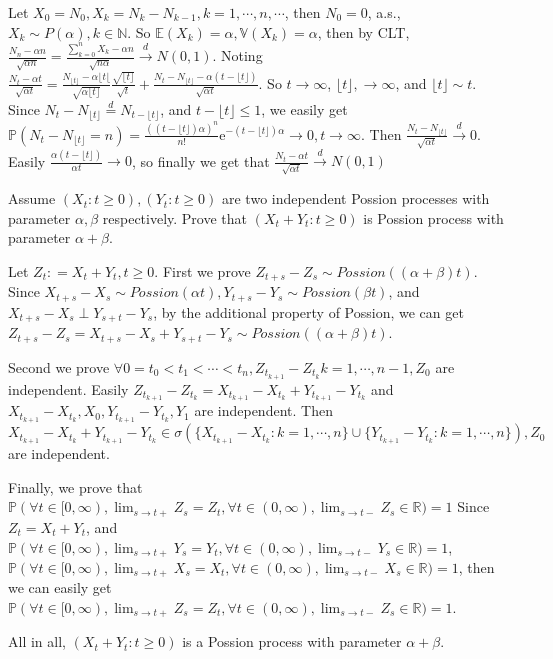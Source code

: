 \documentclass{ctexart}
\newcommand{\floor}[1]{\lfloor #1 \rfloor}
\begin{document}
\begin{solution}
  Let \(X_0=N_0,X_k=N_k-N_{k-1}, k= 1,\cdots,n,\cdots\), then \(N_0=0\), a.s., \(X_k \sim P(\alpha), k \in \mathbb{N}\).
  So \(\mathbb{E}(X_k)=\alpha, \mathbb{V}(X_k)= \alpha\), then by CLT, \(\frac{N_n-\alpha n}{\sqrt{\alpha n}}=\frac{\sum_{k=0}^{n}X_k-\alpha n}{\sqrt{n \alpha}} \overset{d}{\to} N(0,1)\).
  Noting \(\frac{N_t - \alpha t}{\sqrt{ \alpha t}}=\frac{N_{\floor{t}}-\alpha \lfloor t\lfloor}{\sqrt{ \alpha \floor{t}}} \frac{\sqrt{\floor{t}}}{\sqrt{t}} + \frac{N_t-N_{\floor{t}}-\alpha(t-\floor{t})}{\sqrt{\alpha t}}\).
  So \(t \to \infty\), \(\floor{t}, \to \infty\), and \(\floor{t} \sim t\).
  Since \(N_t-N_{\floor{t}}\overset{d}{=}N_{t-\floor{t}}\), and \(t - \floor{t} \leq 1\), we easily get \(\mathbb{P}(N_t-N_{\lfloor t\rfloor}=n)=\frac{((t-\lfloor t\rfloor)\alpha)^n}{n !} \mathrm{e}^{-(t-\lfloor t\rfloor)\alpha} \to 0, t \to \infty\).
  Then \(\frac{N_t-N_{\floor{t}}}{\sqrt{ \alpha t}} \overset{d}{\to} 0\).
  Easily \(\frac{\alpha(t-\floor{t})}{\alpha t} \to 0\), so finally we get that
  \(\frac{N_t-\alpha t}{\sqrt{ \alpha t}} \overset{d}{\to} N(0,1)\)
\end{solution}

\begin{problem}\label{pro:4}
  Assume \((X_t:t \geq 0),(Y_t:t \geq 0)\) are two independent Possion processes with parameter \(\alpha,\beta\) respectively.
  Prove that \((X_t + Y_t:t \geq 0)\) is Possion process with parameter \(\alpha + \beta\).
\end{problem}
\begin{solution}
  Let \(Z_t: =X_t + Y_t, t \geq 0\).
  First we prove \(Z_{t+s}-Z_s \sim Possion((\alpha + \beta)t)\).
  Since \(X_{t + s}-X_s \sim Possion(\alpha t),Y_{t+s}-Y_s \sim Possion(\beta t)\), and \(X_{t + s}-X_s \perp Y_{s + t}-Y_s\),
  by the additional property of Possion, we can get
  \(Z_{t + s}-Z_{s}=X_{t + s}-X_s+Y_{s + t}-Y_s \sim Possion((\alpha + \beta)t)\).

  Second we prove \(\forall 0= t_0 < t_1 <\cdots < t_n,Z_{t_{k + 1}}-Z_{t_k} k=1, \cdots,n-1, Z_0\) are independent.
  Easily \(Z_{t_{k + 1}}-Z_{t_k}= X_{t_{k + 1}}- X_{t_k} + Y_{t_{k + 1}}- Y_{t_k}\) and \(X_{t_{k + 1}} - X_{t_k}, X_0, Y_{t_{k + 1}} - Y_{t_k}, Y_1\) are independent.
  Then \(X_{t_{k + 1}}- X_{t_k} + Y_{t_{k + 1}} - Y_{t_k} \in \sigma(\{X_{t_{k + 1}}- X_{t_k}: k = 1,\cdots,n\} \cup \{Y_{t_{k + 1}}- Y_{t_k}: k=1,\cdots,n\}), Z_0\) are independent.

  Finally, we prove that \(\mathbb{P}(\forall t \in [0,\infty),\lim_{s \to t+}Z_s =Z_t,\forall t \in (0,\infty),\lim_{s \to t-}Z_s \in \mathbb{R})=1\)
  Since \(Z_t=X_t + Y_t\), and
  \(\mathbb{P}(\forall t \in [0,\infty),\lim_{s \to t+}Y_s =Y_t,\forall t \in (0,\infty),\lim_{s \to t-}Y_s \in \mathbb{R})=1\),
  \(\mathbb{P}(\forall t \in [0,\infty),\lim_{s \to t+}X_s =X_t,\forall t \in (0,\infty),\lim_{s \to t-}X_s \in \mathbb{R})=1\),
  then we can easily get \(\mathbb{P}(\forall t \in [0,\infty),\lim_{s \to t+}Z_s =Z_t,\forall t \in (0,\infty),\lim_{s \to t-}Z_s \in \mathbb{R})=1\).

  All in all, \((X_t + Y_t:t \geq 0)\) is a Possion process with parameter \(\alpha + \beta\).
\end{solution}
\end{document}
